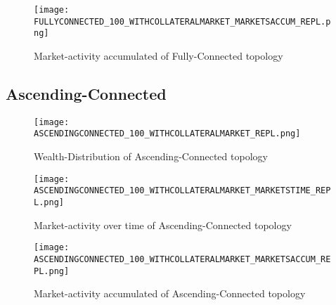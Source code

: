 \documentclass[Bachelorarbeit.tex]{subfiles}
\begin{document}
\begin{figure}[H]
	\centering
  \texttt{[image: FULLYCONNECTED\_100\_WITHCOLLATERALMARKET\_MARKETSACCUM\_REPL.png]}
	\caption{Market-activity accumulated of Fully-Connected topology}
	\label{fig1}
\end{figure}

\subsection{Ascending-Connected}
\begin{figure}[H]
	\centering
  \texttt{[image: ASCENDINGCONNECTED\_100\_WITHCOLLATERALMARKET\_REPL.png]}
	\caption{Wealth-Distribution of Ascending-Connected topology}
	\label{fig1}
\end{figure}

\begin{figure}[H]
	\centering
  \texttt{[image: ASCENDINGCONNECTED\_100\_WITHCOLLATERALMARKET\_MARKETSTIME\_REPL.png]}
	\caption{Market-activity over time of Ascending-Connected topology}
	\label{fig1}
\end{figure}

\begin{figure}[H]
	\centering
  \texttt{[image: ASCENDINGCONNECTED\_100\_WITHCOLLATERALMARKET\_MARKETSACCUM\_REPL.png]}
	\caption{Market-activity accumulated of Ascending-Connected topology}
	\label{fig1}
\end{figure}
\end{document}
